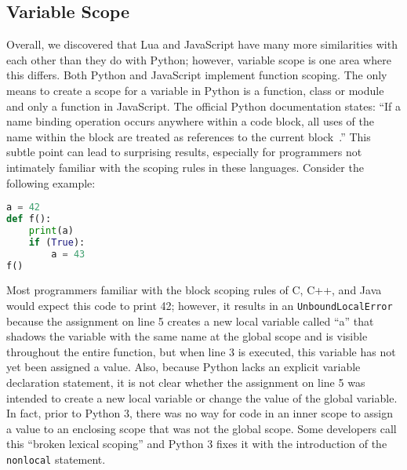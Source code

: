 %
%
%


\subsection{Variable Scope}
\label{varscope}

Overall, we discovered that Lua and JavaScript have many more similarities with
each other than they do with Python; however, variable scope is one area
where this differs. Both Python and JavaScript implement function scoping. The only
means to create a scope for a variable in Python is a function, class or module and
only a function in JavaScript. The official Python documentation states: 
``If a name binding operation occurs anywhere within a code block, all uses of the 
name within the block are treated as references to the current block~\cite{pyscope}.'' 
This subtle point can lead to surprising results, especially for programmers not
intimately familiar with the scoping rules in these languages. Consider the
following example:

\begin{lstlisting}[language=Python,caption=A demonstration of function scope in Python]
a = 42
def f():
	print(a)
	if (True):
		a = 43
f()
\end{lstlisting}

Most programmers familiar with the block scoping rules of C, C++, and Java would expect
this code to print 42; however, it results in an \texttt{UnboundLocalError} because
the assignment on line 5 creates a new local variable called ``a'' that shadows the
variable with the same name at the global scope and is visible throughout the
entire function, but when line 3 is executed, this variable has not yet been assigned
a value. Also, because Python lacks an explicit variable declaration statement,
it is not clear whether the assignment on line 5 was intended to create a new
local variable or change the value of the global variable. In fact, prior to Python 3,
there was no way for code in an inner scope to assign a value to an enclosing scope
that was not the global scope. Some developers call this ``broken lexical scoping'' and 
Python 3 fixes it with the introduction of the \texttt{nonlocal} statement.

